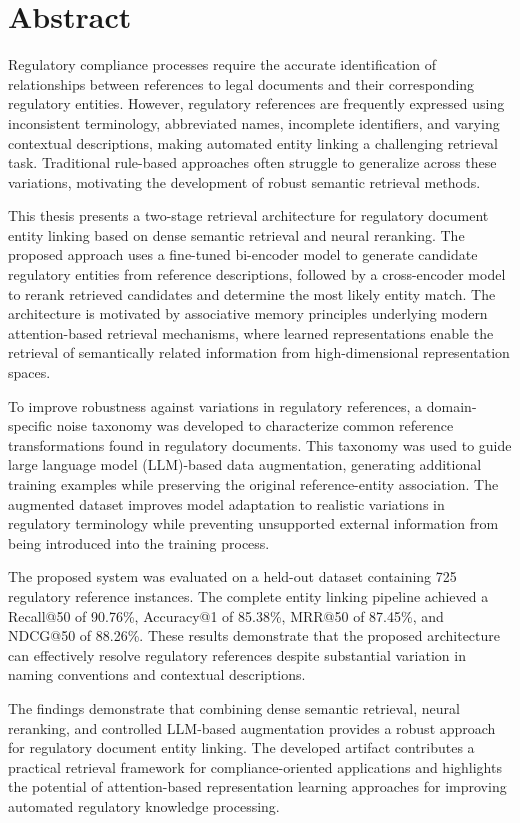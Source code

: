 

\section*{Abstract}

Regulatory compliance processes require the accurate identification of relationships between references to legal documents and their corresponding regulatory entities. However, regulatory references are frequently expressed using inconsistent terminology, abbreviated names, incomplete identifiers, and varying contextual descriptions, making automated entity linking a challenging retrieval task. Traditional rule-based approaches often struggle to generalize across these variations, motivating the development of robust semantic retrieval methods.

This thesis presents a two-stage retrieval architecture for regulatory document entity linking based on dense semantic retrieval and neural reranking. The proposed approach uses a fine-tuned bi-encoder model to generate candidate regulatory entities from reference descriptions, followed by a cross-encoder model to rerank retrieved candidates and determine the most likely entity match. The architecture is motivated by associative memory principles underlying modern attention-based retrieval mechanisms, where learned representations enable the retrieval of semantically related information from high-dimensional representation spaces.

To improve robustness against variations in regulatory references, a domain-specific noise taxonomy was developed to characterize common reference transformations found in regulatory documents. This taxonomy was used to guide large language model (LLM)-based data augmentation, generating additional training examples while preserving the original reference-entity association. The augmented dataset improves model adaptation to realistic variations in regulatory terminology while preventing unsupported external information from being introduced into the training process.

The proposed system was evaluated on a held-out dataset containing 725 regulatory reference instances. The complete entity linking pipeline achieved a Recall@50 of 90.76\%, Accuracy@1 of 85.38\%, MRR@50 of 87.45\%, and NDCG@50 of 88.26\%. These results demonstrate that the proposed architecture can effectively resolve regulatory references despite substantial variation in naming conventions and contextual descriptions.

The findings demonstrate that combining dense semantic retrieval, neural reranking, and controlled LLM-based augmentation provides a robust approach for regulatory document entity linking. The developed artifact contributes a practical retrieval framework for compliance-oriented applications and highlights the potential of attention-based representation learning approaches for improving automated regulatory knowledge processing.



